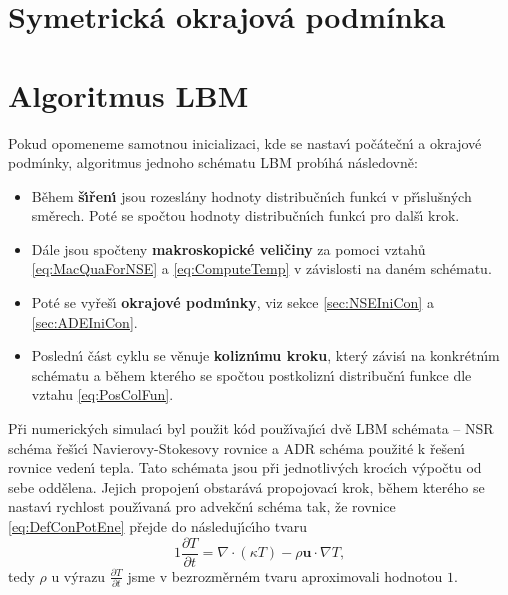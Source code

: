     \section{Symetrick\'{a} okrajov\'{a} podm\'{i}nka}
        
        
    
    \section{Algoritmus LBM}
    \label{sec:LbmAlg}
        
        Pokud opomeneme samotnou inicializaci, kde se nastav\'{\i} po\v{c}\'{a}te\v{c}n\'{\i} a okrajov\'{e} podm\'{\i}nky, algoritmus jednoho sch\'{e}matu LBM prob\'{\i}h\'{a} n\'{a}sledovn\v{e}:
        \begin{itemize}
            \item B\v{e}hem \textbf{\v{s}\'{\i}\v{r}en\'{\i}} jsou rozesl\'{a}ny hodnoty distribu\v{c}n\'{\i}ch funkc\'{\i} v p\v{r}\'{\i}slu\v{s}n\'{y}ch sm\v{e}rech. Pot\'{e} se spo\v{c}tou hodnoty distribu\v{c}n\'{\i}ch funkc\'{\i} pro dal\v{s}\'{\i} krok. 
            \item D\'{a}le jsou spo\v{c}teny \textbf{makroskopick\'{e} veli\v{c}iny} za pomoci vztah\r{u} \eqref{eq:MacQuaForNSE} a \eqref{eq:ComputeTemp} v z\'{a}vislosti na dan\'{e}m sch\'{e}matu.
            \item Pot\'{e} se vy\v{r}e\v{s}\'{\i} \textbf{okrajov\'{e} podm\'{\i}nky}, viz sekce \ref{sec:NSEIniCon} a \ref{sec:ADEIniCon}. 
            \item Posledn\'{\i} \v{c}\'{a}st cyklu se v\v{e}nuje \textbf{kolizn\'{\i}mu kroku}, kter\'{y} z\'{a}vis\'{\i} na konkr\'{e}tn\'{\i}m sch\'{e}matu a b\v{e}hem kter\'{e}ho se spo\v{c}tou postkolizn\'{\i} distribu\v{c}n\'{\i} funkce dle vztahu \eqref{eq:PosColFun}.
        \end{itemize}

        P\v{r}i numerick\'{y}ch simulac\'{\i} byl pou\v{z}it k\'{o}d pou\v{z}\'{\i}vaj\'{\i}c\'{\i} dv\v{e} LBM sch\'{e}mata -- NSR sch\'{e}ma \v{r}e\v{s}\'{\i}c\'{\i} Navierovy-Stokesovy rovnice a ADR sch\'{e}ma pou\v{z}it\'{e} k \v{r}e\v{s}en\'{\i} rovnice veden\'{\i} tepla. Tato sch\'{e}mata jsou p\v{r}i jednotliv\'{y}ch kroc\'{\i}ch v\'{y}po\v{c}tu od sebe odd\v{e}lena. Jejich propojen\'{\i} obstar\'{a}v\'{a} propojovac\'{\i} krok, b\v{e}hem kter\'{e}ho se nastav\'{\i} rychlost pou\v{z}\'{\i}van\'{a} pro advek\v{c}n\'{\i} sch\'{e}ma tak, \v{z}e rovnice \eqref{eq:DefConPotEne} p\v{r}ejde do n\'{a}sleduj\'{\i}c\'{\i}ho tvaru
        \begin{equation}
            1\frac{\partial T}{\partial t} = \nabla \cdot ( \kappa T) - \rho \boldsymbol{u} \cdot \nabla T,
        \end{equation}
        tedy $\rho$ u v\'{y}razu $\frac{\partial T}{\partial t}$ jsme v bezrozm\v{e}rn\'{e}m tvaru aproximovali hodnotou $1$. 
        
